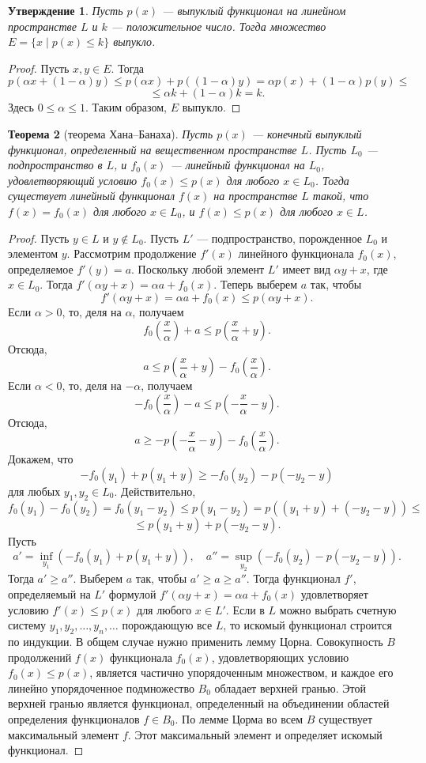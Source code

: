\documentclass[12pt, titlepage, oneside]{amsbook}
\newtheorem{theorem}{Теорема}[chapter]
\newtheorem{claim}[theorem]{Утверждение}
\theoremstyle{definition}
\theoremstyle{remark}
\begin{document}
\begin{claim}
	\label{Vyp2}
	Пусть $p(x)$ --- выпуклый функционал на линейном пространстве $L$ и $k$ --- положительное число. Тогда множество $E=\{x\mid p(x)\leq k\}$ выпукло.
\end{claim}

\begin{proof}
	Пусть $x,y\in E$. Тогда $$p(\alpha x+(1-\alpha)y)\leq p(\alpha x)+p((1-\alpha)y)=\alpha p(x)+(1-\alpha)p(y)\leq$$ $$\leq\alpha k+(1-\alpha)k=k.$$ Здесь $0\leq\alpha\leq 1$. Таким образом, $E$ выпукло.
\end{proof}

\begin{theorem}[теорема Хана--Банаха]
	\label{HanBan1}
	Пусть $p(x)$ --- конечный выпуклый функционал, определенный на вещественном пространстве $L$. Пусть $L_0$ --- подпространство в $L$, и $f_0(x)$ --- линейный функционал на $L_0$, удовлетворяющий условию $f_0(x)\leq p(x)$ для любого $x\in L_0$. Тогда существует линейный функционал $f(x)$ на пространстве $L$ такой, что $f(x)=f_0(x)$ для любого $x\in L_0$, и $f(x)\leq p(x)$ для любого $x\in L$.
\end{theorem}

\begin{proof}
	Пусть $y\in L$ и $y\not\in L_0$. Пусть $L'$ --- подпространство, порожденное $L_0$ и элементом $y$. Рассмотрим продолжение $f'(x)$ линейного функционала $f_0(x)$, определяемое $f'(y)=a$. Поскольку любой элемент $L'$ имеет вид $\alpha y+x$, где $x\in L_0$. Тогда $f'(\alpha y+x)=\alpha a+f_0(x)$. Теперь выберем $a$ так, чтобы $$f'(\alpha y+x)=\alpha a+f_0(x)\leq p(\alpha y+x).$$ Если $\alpha>0$, то, деля на $\alpha$, получаем $$f_0\left(\frac{x}{\alpha}\right)+a\leq p\left(\frac{x}{\alpha}+y\right).$$ Отсюда, $$a\leq p\left(\frac{x}{\alpha}+y\right)-f_0\left(\frac{x}{\alpha}\right).$$ Если $\alpha<0$, то, деля на $-\alpha$, получаем $$-f_0\left(\frac{x}{\alpha}\right)-a\leq p\left(-\frac{x}{\alpha}-y\right).$$ Отсюда, $$a\geq -p\left(-\frac{x}{\alpha}-y\right)-f_0\left(\frac{x}{\alpha}\right).$$ Докажем, что $$-f_0(y_1)+p(y_1+y)\geq -f_0(y_2)-p(-y_2-y)$$ для любых $y_1,y_2\in L_0$. Действительно, $$f_0(y_1)-f_0(y_2)=f_0(y_1-y_2)\leq p(y_1-y_2)=p((y_1+y)+(-y_2-y))\leq$$ $$\leq p(y_1+y)+p(-y_2-y).$$ Пусть $$a'=\inf\limits_{y_1}(-f_0(y_1)+p(y_1+y)),\quad a''=\sup\limits_{y_2}(-f_0(y_2)-p(-y_2-y)).$$ Тогда $a'\geq a''$. Выберем $a$ так, чтобы $a'\geq a\geq a''$. Тогда функционал $f'$, определяемый на $L'$ формулой $f'(\alpha y+x)=\alpha a+f_0(x)$ удовлетворяет условию $f'(x)\leq p(x)$ для любого $x\in L'$. Если в $L$ можно выбрать счетную систему $y_1,y_2,\ldots,y_n,\ldots$ порождающую все $L$, то искомый функционал строится по индукции. В общем случае нужно применить лемму Цорна. Совокупность $B$ продолжений $f(x)$ функционала $f_0(x)$, удовлетворяющих условию $f_0(x)\leq p(x)$, является частично упорядоченным множеством, и каждое его линейно упорядоченное подмножество $B_0$ обладает верхней гранью. Этой верхней гранью является функционал, определенный на объединении областей определения функционалов $f\in B_0$. По лемме Цорма во всем $B$ существует максимальный элемент $f$. Этот максимальный элемент и определяет искомый функционал.
\end{proof}
\end{document}
